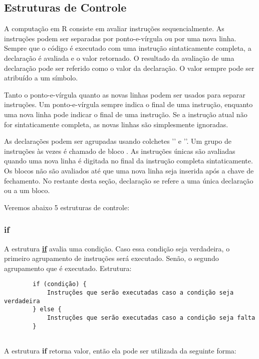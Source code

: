     \subsection{Estruturas de Controle}
      A computação em R consiste em avaliar instruções sequencialmente. As instruções podem ser separadas por ponto-e-vírgula ou por uma nova linha. Sempre que o código é executado com uma instrução sintaticamente completa, a declaração é avaliada e o valor retornado. O resultado da avaliação de uma declaração pode ser referido como o valor da declaração. O valor sempre pode ser atribuído a um símbolo.
      
      Tanto o ponto-e-vírgula quanto as novas linhas podem ser usados para separar instruções. Um ponto-e-vírgula sempre indica o final de uma instrução, enquanto uma nova linha pode indicar o final de uma instrução. Se a instrução atual não for sintaticamente completa, as novas linhas são simplesmente ignoradas.
      
      As declarações podem ser agrupadas usando colchetes '{' e '}'. Um grupo de instruções às vezes é chamado de bloco . As instruções únicas são avaliadas quando uma nova linha é digitada no final da instrução completa sintaticamente. Os blocos não são avaliados até que uma nova linha seja inserida após a chave de fechamento. No restante desta seção, declaração se refere a uma única declaração ou a um bloco.
      
      Veremos abaixo 5 estruturas de controle:

      \subsubsection{if}      
      	A estrutura \href{https://cran.r-project.org/doc/manuals/r-release/R-lang.html#if}{\textbf{if}} \cite{Team2021b} avalia uma condição. Caso essa condição seja verdadeira, o primeiro agrupamento de instruções será executado. Senão, o segundo agrupamento que é executado.
        Estrutura:
        
        \color{blue}
        \begin{verbatim}
        if (condição) {
            Instruções que serão executadas caso a condição seja verdadeira
        } else {
            Instruções que serão executadas caso a condição seja falta
        }
        
		    \end{verbatim}
		\color{black}
        A estrutura \textbf{if} retorna valor, então ela pode ser utilizada da seguinte forma:
        

